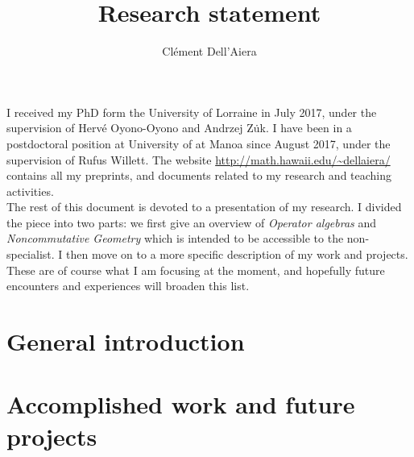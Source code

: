 \documentclass[a4paper]{article}
\title{Research statement}
\date{}
\author{ Cl\'ement Dell'Aiera}
\begin{document}
\maketitle

I received my PhD form the University of Lorraine in July 2017, under the supervision of Herv\'e Oyono-Oyono and Andrzej Z\.{u}k. I have been in a postdoctoral position at University of \Hawaii  at Manoa since August 2017, under the supervision of Rufus Willett. The website \url{http://math.hawaii.edu/~dellaiera/} contains all my preprints, and documents related to my research and teaching activities.\\ 

The rest of this document is devoted to a presentation of my research. I divided the piece into two parts: we first give an overview of \textit{Operator algebras} and \textit{Noncommutative Geometry} which is intended to be accessible to the non-specialist. I then move on to a more specific description of my work and projects. These are of course what I am focusing at the moment, and hopefully future encounters and experiences will broaden this list.

\section{General introduction}


\section{Accomplished work and future projects}


 
\end{document}
